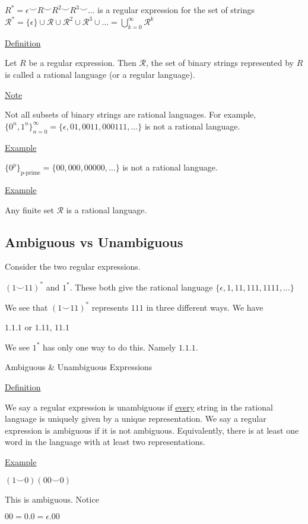 \documentclass{article}
\newcommand\mc{\mathcal}
\begin{document}
$R^* = \epsilon \smile R \smile R^2 \smile R^3 \smile \ldots$ is a regular expression for the set of strings $\mc{R}^* = \{\epsilon\} \cup \mc{R} \cup \mc{R}^2 \cup \mc{R}^3 \cup \ldots = \bigcup_{k=0}^{\infty}\mc{R}^k$

\underline{Definition}

Let $R$ be a regular expression. Then $\mc{R}$, the set of binary strings represented by $R$ is called a rational language (or a regular language). 

\underline{Note}

Not all subsets of binary strings are rational languages. For example, $\{0^n,1^n\}_{n=0}^{\infty} = \{\epsilon, 01,0011,000111,\ldots\}$ is not a rational language.

\underline{Example}

$\{0^p\}_{\text{p-prime}} = \{00,000,00000,\ldots\}$ is not a rational language.

\underline{Example}

Any finite set $\mc{R}$ is a rational language.

\subsection{Ambiguous vs Unambiguous}

Consider the two regular expressions.

$(1\smile11)^*$ and $1^*$. These both give the rational language $\{\epsilon, 1, 11, 111, 1111,\ldots\}$

We see that $(1\smile11)^*$ represents $111$ in three different ways. We have

$1.1.1$ or $1.11$, $11.1$

We see $1^*$ has only one way to do this. Namely $1.1.1$.

Ambiguous \& Unambiguous Expressions

\underline{Definition}

We say a regular expression is unambiguous if \underline{every} string in the rational language is uniquely given by a unique representation. We say a regular expression is ambiguous if it is not ambiguous. Equivalently, there is at least one word in the language with at least two representations. 

\underline{Example}

$(1\smile0)(00\smile0)$

This is ambiguous. Notice

$00 = 0.0 = \epsilon.00$
\end{document}
